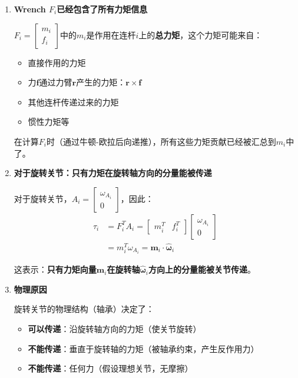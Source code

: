 \documentclass[12pt,a4paper]{article}
\begin{document}
\begin{enumerate}
\item \textbf{Wrench $F_i$已经包含了所有力矩信息}

$F_i = \begin{bmatrix} m_i \\ f_i \end{bmatrix}$中的$m_i$是作用在连杆$i$上的\textbf{总力矩}，这个力矩可能来自：
\begin{itemize}
\item 直接作用的力矩
\item 力$\bm{f}$通过力臂$\bm{r}$产生的力矩：$\bm{r} \times \bm{f}$
\item 其他连杆传递过来的力矩
\item 惯性力矩等
\end{itemize}

在计算$F_i$时（通过牛顿-欧拉后向递推），所有这些力矩贡献已经被汇总到$m_i$中了。

\item \textbf{对于旋转关节：只有力矩在旋转轴方向的分量能被传递}

对于旋转关节，$A_i = \begin{bmatrix} \omega_{A_i} \\ 0 \end{bmatrix}$，因此：
\begin{align}
\tau_i &= F_i^T A_i = \begin{bmatrix} m_i^T & f_i^T \end{bmatrix} \begin{bmatrix} \omega_{A_i} \\ 0 \end{bmatrix} \\
&= m_i^T \omega_{A_i} = \bm{m}_i \cdot \hat{\bm{\omega}}_i
\end{align}

这表示：\textbf{只有力矩向量$\bm{m}_i$在旋转轴$\hat{\bm{\omega}}_i$方向上的分量能被关节传递}。

\item \textbf{物理原因}

旋转关节的物理结构（轴承）决定了：
\begin{itemize}
\item \textbf{可以传递}：沿旋转轴方向的力矩（使关节旋转）
\item \textbf{不能传递}：垂直于旋转轴的力矩（被轴承约束，产生反作用力）
\item \textbf{不能传递}：任何力（假设理想关节，无摩擦）
\end{itemize}


\end{enumerate}
\end{document}

